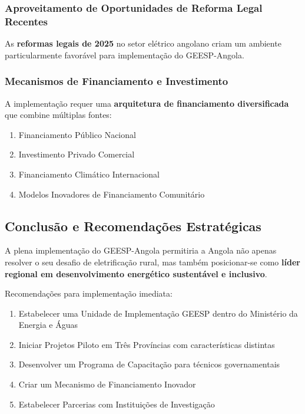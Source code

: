 \documentclass[12pt, a4paper]{article}
\begin{document}
\begin{itemize}
\subsubsection{Aproveitamento de Oportunidades de Reforma Legal Recentes}

As \textbf{reformas legais de 2025} no setor elétrico angolano criam um ambiente particularmente favorável para implementação do GEESP-Angola.

\subsubsection{Mecanismos de Financiamento e Investimento}

A implementação requer uma \textbf{arquitetura de financiamento diversificada} que combine múltiplas fontes:
\begin{enumerate}
\item Financiamento Público Nacional
\item Investimento Privado Comercial
\item Financiamento Climático Internacional
\item Modelos Inovadores de Financiamento Comunitário
\end{enumerate}

\subsection{Conclusão e Recomendações Estratégicas}

A plena implementação do GEESP-Angola permitiria a Angola não apenas resolver o seu desafio de eletrificação rural, mas também posicionar-se como \textbf{líder regional em desenvolvimento energético sustentável e inclusivo}.

Recomendações para implementação imediata:
\begin{enumerate}
\item Estabelecer uma Unidade de Implementação GEESP dentro do Ministério da Energia e Águas
\item Iniciar Projetos Piloto em Três Províncias com características distintas
\item Desenvolver um Programa de Capacitação para técnicos governamentais
\item Criar um Mecanismo de Financiamento Inovador
\item Estabelecer Parcerias com Instituições de Investigação
\end{enumerate}


\end{itemize}
\end{document}

